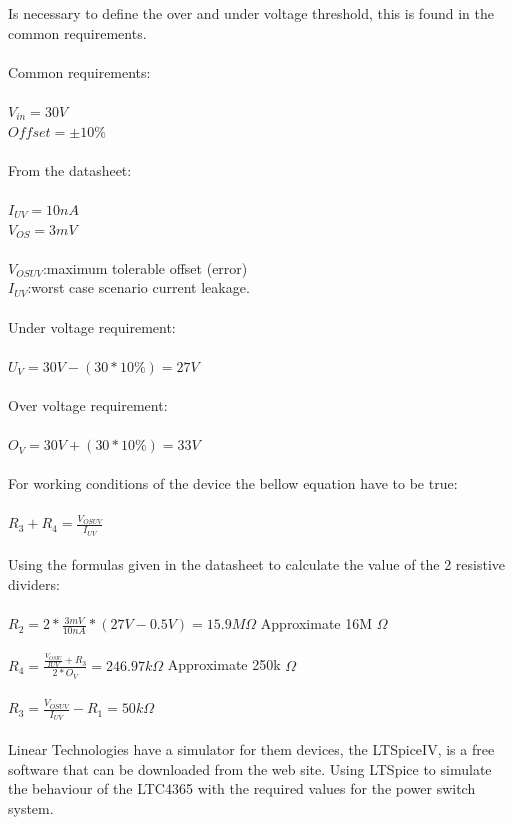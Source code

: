 Is necessary to define the over and under voltage threshold, this is found in the common requirements.\\
\\
Common requirements:\\\\
$V_{in} = 30V$ \\
$Offset = \pm 10\% $\\
\\
From the datasheet:\\\\
$ I_{UV} = 10nA $ \\
$ V_{OS} = 3mV $\\
\\
$V_{OSUV}$:maximum tolerable offset (error)\\
$I_{UV}$:worst case scenario current leakage.\\
\\
Under voltage requirement:\\\\
$ U_V=30V-(30*10\%)=27V $\\
\\
Over voltage requirement:\\\\
$ O_V=30V+(30*10\%)=33V $\\
\\
For working conditions of the device the bellow equation have to be true:\\\\
$ R_3+R_4=\frac{V_{OSUV}}{I_{UV}} $\\
\\
Using the formulas given in the datasheet to calculate the value of the 2 resistive dividers:\\\\
$ R_2 = 2*\frac{3mV}{10nA}*(27V-0.5V) = 15.9M\Omega $ Approximate 16M $\Omega $\\ 
\\
$ R_4 = \frac{\frac{V_{OSIU}}{I{UV}}+R_3}{2*O_V} = 246.97k\Omega $ Approximate 250k $\Omega $\\ 
\\
$ R_3 = \frac{V_{OSUV}}{I_{UV}}-R_1 = 50k\Omega $\\
\\
%
Linear Technologies have a simulator for them devices, the LTSpiceIV, is a free software that can be downloaded from the web site.
Using LTSpice to simulate the behaviour of the LTC4365 with the required values for the power switch system.
%
